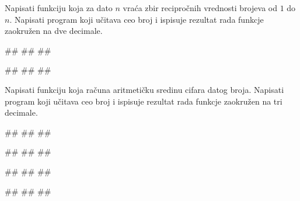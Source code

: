 \begin{Exercise}[label=v1.4_04] 
Napisati funkciju  koja za dato
$n$ vraća zbir recipročnih vrednosti brojeva od $1$ do $n$. Napisati
program koji učitava ceo broj i ispisuje rezultat rada funkcje
zaokružen na dve decimale.

\begin{miditest}
\begin{upotreba}{1}
#\naslovInt#
##
##
\end{upotreba}
\end{miditest}
\begin{miditest}
\begin{upotreba}{2}
#\naslovInt#
##
##
\end{upotreba}
\end{miditest}

\end{Exercise}
\begin{Answer}[ref=v1.4_04]
\end{Answer}

\begin{Exercise}[label=v1.4_05] 
 Napisati funkciju  koja računa
 aritmetičku sredinu cifara datog broja. Napisati program koji učitava
 ceo broj i ispisuje rezultat rada funkcje zaokružen na tri decimale.

\begin{miditest}
\begin{upotreba}{1}
#\naslovInt#
##
##
\end{upotreba}
\end{miditest}
\begin{miditest}
\begin{upotreba}{2}
#\naslovInt#
##
##
\end{upotreba}
\end{miditest}

\begin{miditest}
\begin{upotreba}{3}
#\naslovInt#
##
##
\end{upotreba}
\end{miditest}
\begin{miditest}
\begin{upotreba}{4}
#\naslovInt#
##
##
\end{upotreba}
\end{miditest}
\end{Exercise}
\begin{Answer}[ref=v1.4_05]
\end{Answer}


